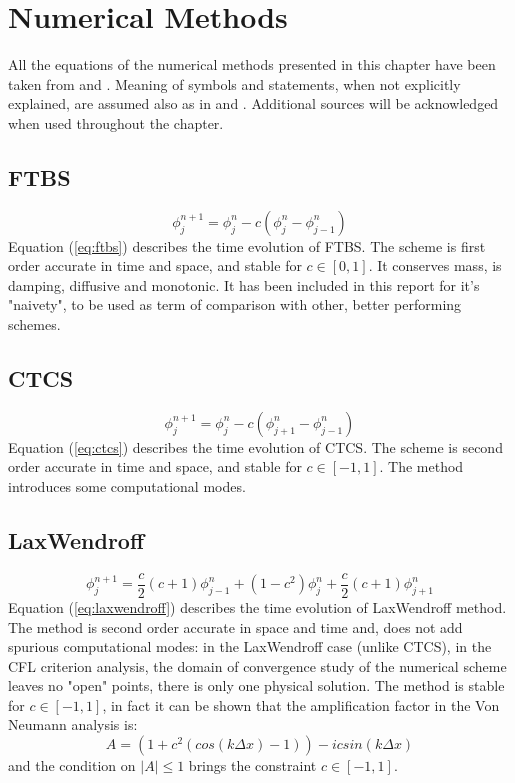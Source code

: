 
\section{Numerical Methods}
All the equations of the numerical methods presented in this chapter have been taken from \cite{mpebook} and \cite{nmnotes}. Meaning of symbols and statements, when not explicitly explained, are assumed also as in \cite{mpebook} and \cite{nmnotes}. Additional sources will be acknowledged when used throughout the chapter.

\subsection{FTBS}

\begin{equation}
\phi_j^{n+1}=\phi_j^{n}-c(\phi_j^{n}-\phi_{j-1}^{n})
\label{eq:ftbs}
\end{equation}
Equation (\ref{eq:ftbs}) describes the time evolution of FTBS. The scheme is first order accurate in time and space, and stable for $c\in[0,1]$. It conserves mass, is damping, diffusive and monotonic. It has been included in this report for it's "naivety", to be used as term of comparison with other, better performing schemes.


\subsection{CTCS}
\begin{equation}
\phi_j^{n+1}=\phi_j^{n}-c(\phi_{j+1}^{n}-\phi_{j-1}^{n})
\label{eq:ctcs}
\end{equation}
Equation (\ref{eq:ctcs}) describes the time evolution of CTCS. The scheme is second order accurate in time and space, and stable for $c\in[-1,1]$. The method introduces some computational modes.

\subsection{LaxWendroff}
\begin{equation}
\phi_j^{n+1}=\frac{c}{2}(c+1)\phi_{j-1}^{n}+(1-c^2)\phi_{j}^{n}+\frac{c}{2}(c+1)\phi_{j+1}^{n}
\label{eq:laxwendroff}
\end{equation}
Equation (\ref{eq:laxwendroff}) describes the time evolution of LaxWendroff method. The method is second order accurate in space and time and, does not add spurious computational modes: in the LaxWendroff case (unlike CTCS), in the CFL criterion analysis, the domain of convergence study of the numerical scheme leaves no "open" points, there is only one physical solution. The method is stable for $c\in[-1,1]$, in fact it can be shown that the amplification factor in the Von Neumann analysis is:
\begin{equation}
\label{eq:laxwen_vonneumann}
A=(1+c^2(cos(k\Delta x)-1))-icsin(k\Delta x)
\end{equation}
and the condition on $|A|\leq1$ brings the constraint $c\in[-1,1]$.

